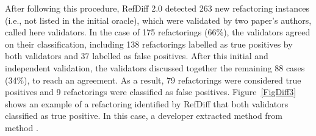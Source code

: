 




After following this procedure, RefDiff 2.0 detected 263 new refactoring instances (i.e., not listed in the initial oracle), which were validated by two paper's authors, called here validators. In the case of 175 refactorings (66\%), the validators agreed on their classification, including 138 refactorings labelled as true positives by both validators and 37 labelled as false positives. After this initial and independent validation, the validators discussed together the remaining 88 cases (34\%), to reach an agreement. As a result, 79 refactorings were considered true positives and 9 refactorings were classified as false positives.
Figure~\ref{FigDiff3} shows an example of a refactoring identified by RefDiff that both validators classified as true positive.
In this case, a developer extracted method  from method .

